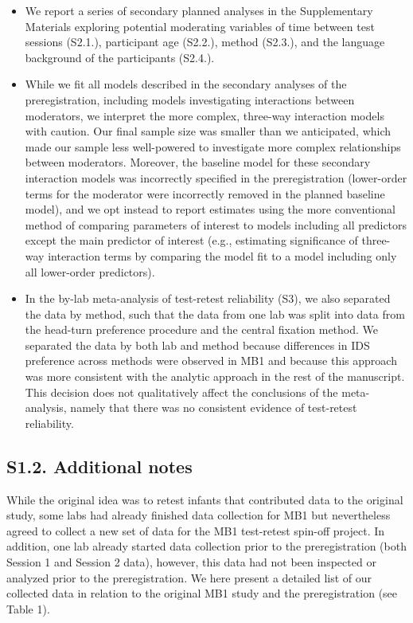 \documentclass[
  man, donotrepeattitle,floatsintext]{apa6}
\begin{document}
\begin{itemize}
\item
  We report a series of secondary planned analyses in the Supplementary Materials exploring potential moderating variables of time between test sessions (S2.1.), participant age (S2.2.), method (S2.3.), and the language background of the participants (S2.4.).
\item
  While we fit all models described in the secondary analyses of the preregistration, including models investigating interactions between moderators, we interpret the more complex, three-way interaction models with caution. Our final sample size was smaller than we anticipated, which made our sample less well-powered to investigate more complex relationships between moderators. Moreover, the baseline model for these secondary interaction models was incorrectly specified in the preregistration (lower-order terms for the moderator were incorrectly removed in the planned baseline model), and we opt instead to report estimates using the more conventional method of comparing parameters of interest to models including all predictors except the main predictor of interest (e.g., estimating significance of three-way interaction terms by comparing the model fit to a model including only all lower-order predictors).
\item
  In the by-lab meta-analysis of test-retest reliability (S3), we also separated the data by method, such that the data from one lab was split into data from the head-turn preference procedure and the central fixation method. We separated the data by both lab and method because differences in IDS preference across methods were observed in MB1 and because this approach was more consistent with the analytic approach in the rest of the manuscript. This decision does not qualitatively affect the conclusions of the meta-analysis, namely that there was no consistent evidence of test-retest reliability.
\end{itemize}

\hypertarget{s1.2.-additional-notes}{%
\subsection{S1.2. Additional notes}\label{s1.2.-additional-notes}}

While the original idea was to retest infants that contributed data to the original study, some labs had already finished data collection for MB1 but nevertheless agreed to collect a new set of data for the MB1 test-retest spin-off project. In addition, one lab already started data collection prior to the preregistration (both Session 1 and Session 2 data), however, this data had not been inspected or analyzed prior to the preregistration. We here present a detailed list of our collected data in relation to the original MB1 study and the preregistration (see Table 1).
\end{document}
